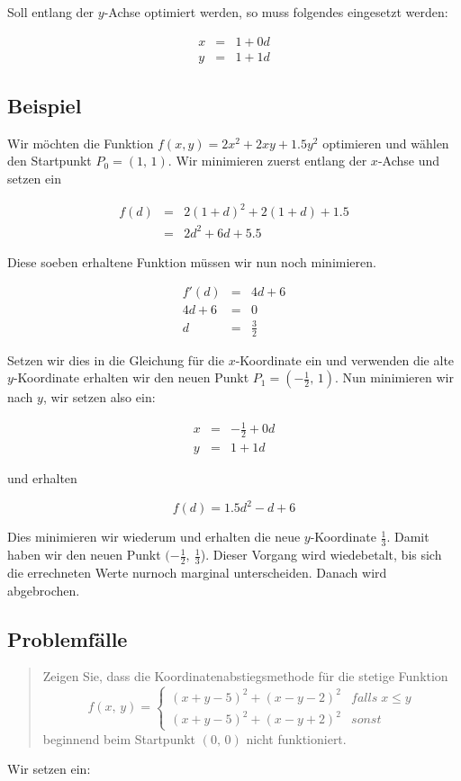 \documentclass[naustrian]{article}
\begin{document}
{Soll entlang der $y$-Achse optimiert werden, so muss folgendes eingesetzt
werden:

\begin{eqnarray*}
    x & = & 1+0d\\
    y & = & 1+1d
\end{eqnarray*}



\subsection{Beispiel}

Wir möchten die Funktion $f(x,y)=2x^{2}+2xy+1.5y^{2}$ optimieren
und wählen den Startpunkt $P_{0}=(1,\,1)$. Wir minimieren zuerst
entlang der $x$-Achse und setzen ein

\begin{eqnarray*}
    f(d) & = & 2(1+d)^{2}+2(1+d)+1.5\\
    & = & 2d^{2}+6d+5.5
\end{eqnarray*}

Diese soeben erhaltene Funktion müssen wir nun noch minimieren.

\begin{eqnarray*}
    f'(d) & = & 4d+6\\
    4d+6 & = & 0\\
    d & = & \frac{3}{2}
\end{eqnarray*}


Setzen wir dies in die Gleichung für die $x$-Koordinate ein und verwenden
die alte $y$-Koordinate erhalten wir den neuen Punkt $P_{1}=(-\frac{1}{2},\,1)$.
Nun minimieren wir nach $y$, wir setzen also ein:

\begin{eqnarray*}
    x & = & -\frac{1}{2}+0d\\
    y & = & 1+1d
\end{eqnarray*}


und erhalten

\[
    f(d)=1.5d^{2}-d+6
\]

Dies minimieren wir wiederum und erhalten die neue $y$-Koordinate
$\frac{1}{3}$. Damit haben wir den neuen Punkt $(-\frac{1}{2},\:\frac{1}{3}$).
Dieser Vorgang wird wiedebetalt, bis sich die errechneten Werte nurnoch
marginal unterscheiden. Danach wird abgebrochen.


\subsection{Problemfälle}
\begin{quotation}
    \noindent Zeigen Sie, dass die Koordinatenabstiegsmethode für die stetige Funktion
    \[
        f(x,\,y)=
        \begin{cases}
            (x+y-5)^{2}+(x-y-2)^{2} & falls\;x\le y\\
            (x+y-5)^{2}+(x-y+2)^{2} & sonst
        \end{cases}
    \]
    beginnend beim Startpunkt $(0,\,0)$ nicht funktioniert.
\end{quotation}
Wir setzen ein:

}
\end{document}
